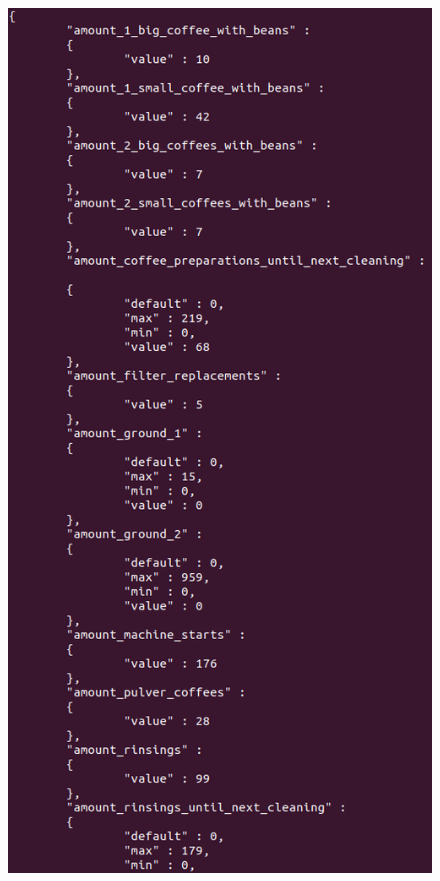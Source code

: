 \documentclass[
  de, %
  inputenc=utf8,
]{tuhhslides}
\begin{document}
\begin{frame}
  \begin{figure}
    \begin{center}
      \hspace*{-0.6cm}
      \includegraphics[scale=0.3]{Material/API-EEPROM}
    \end{center}
  \end{figure}
\end{frame}
\end{document}
